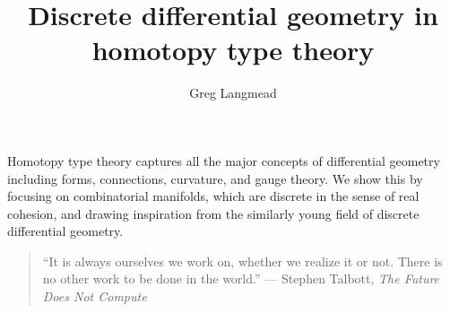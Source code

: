 \documentclass[12pt,fleqn]{article}
\title{Discrete differential geometry in homotopy type theory}
\author{Greg Langmead}
\renewenvironment{abstract}{\section*{\abstractname}}{}
\begin{document}
\maketitle

\begin{abstract}
Homotopy type theory captures all the major concepts of differential geometry including forms, connections, curvature, and gauge theory. We show this by focusing on combinatorial manifolds, which are discrete in the sense of real cohesion\cite{shulman_cohesion}, and drawing inspiration from the similarly young field of discrete differential geometry.

\end{abstract}

\begin{quote} 
\centering
``It is always ourselves we work on, whether we realize it or not. There is no other work to be done in the world.'' --- Stephen Talbott, \emph{The Future Does Not Compute}\cite{talbott}
\end{quote}












\end{document}
